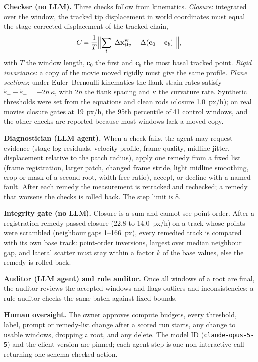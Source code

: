 \documentclass[conference]{IEEEtran}
\begin{document}
\textbf{Checker (no LLM).} Three checks follow from kinematics. \emph{Closure}: integrated over the window, the tracked tip displacement in world coordinates must equal the stage-corrected displacement of the tracked chain,
\begin{equation}
C=\frac{1}{T}\Bigl\|\sum_t \bigl[\Delta\mathbf{x}^{\mathrm{w}}_{\mathrm{tip}}-\Delta(\mathbf{c}_0-\mathbf{c}_b)\bigr]\Bigr\|,
\end{equation}
with $T$ the window length, $\mathbf{c}_0$ the first and $\mathbf{c}_b$ the most basal tracked point. \emph{Rigid invariance}: a copy of the movie moved rigidly must give the same profile. \emph{Plane sections}: under Euler--Bernoulli kinematics the flank strain rates satisfy $\dot\varepsilon_+-\dot\varepsilon_-=-2h\,\dot\kappa$, with $2h$ the flank spacing and $\dot\kappa$ the curvature rate. Synthetic thresholds were set from the equations and clean rods (closure 1.0~px/h); on real movies closure gates at 19~px/h, the 95th percentile of 41 control windows, and the other checks are reported because most windows lack a moved copy.

\textbf{Diagnostician (LLM agent).} When a check fails, the agent may request evidence (stage-log residuals, velocity profile, frame quality, midline jitter, displacement relative to the patch radius), apply one remedy from a fixed list (frame registration, larger patch, changed frame stride, light midline smoothing, crop or mask of a second root, width-free ratio), accept, or decline with a named fault. After each remedy the measurement is retracked and rechecked; a remedy that worsens the checks is rolled back. The step limit is 8.

\textbf{Integrity gate (no LLM).} Closure is a sum and cannot see point order. After a registration remedy passed closure (22.8 to 14.0~px/h) on a track whose points were scrambled (neighbour gaps 1--166~px), every remedied track is compared with its own base track: point-order inversions, largest over median neighbour gap, and lateral scatter must stay within a factor $k$ of the base values, else the remedy is rolled back.

\textbf{Auditor (LLM agent) and rule auditor.} Once all windows of a root are final, the auditor reviews the accepted windows and flags outliers and inconsistencies; a rule auditor checks the same batch against fixed bounds.

\textbf{Human oversight.} The owner approves compute budgets, every threshold, label, prompt or remedy-list change after a scored run starts, any change to usable windows, dropping a root, and any delete. The model ID (\texttt{claude-opus-5-5}) and the client version are pinned; each agent step is one non-interactive call returning one schema-checked action.
\end{document}
